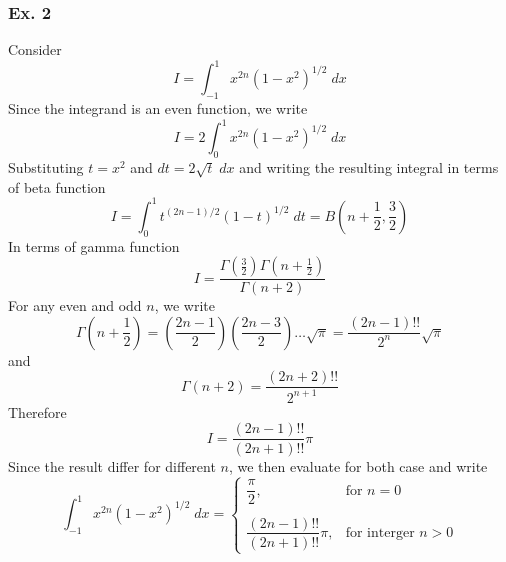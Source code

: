 \documentclass[../../main.tex]{subfiles}
\begin{document}
\subsubsection*{Ex. 2} Consider 
\begin{equation*}
    I=\int_{-1}^{1}x^{2n}(1-x^2)^{1/2}\;dx
\end{equation*}
Since the integrand is an even function, we write 
\begin{equation*}
    I=2\int_{0}^{1}x^{2n}(1-x^2)^{1/2}\;dx
\end{equation*}
Substituting $t=x^2$ and $dt=2\sqrt{t}\;dx$ and writing the resulting integral in terms of beta function
\begin{equation*}
    I=\int_{0}^{1}t^{(2n-1)/2}(1-t)^{1/2}\;dt=B\left(n+\frac{1}{2}, \frac{3}{2}\right)
\end{equation*}
In terms of gamma function
\begin{equation*}
    I=\frac{\Gamma\left(\frac{3}{2}\right)\Gamma\left(n+\frac{1}{2}\right)}{\Gamma(n+2)}
\end{equation*}
For any even and odd $n$, we write 
\begin{equation*}
    \Gamma\left(n+\frac{1}{2}\right)=\left(\frac{2n-1}{2}\right)\left(\frac{2n-3}{2}\right) \dots \sqrt{\pi}=\frac{(2n-1)!!}{2^n}\sqrt{\pi}
\end{equation*}
and 
\begin{equation*}
    \Gamma(n+2)=\frac{(2n+2)!!}{2^{n+1}}
\end{equation*}
Therefore
\begin{equation*}
    I= \frac{(2n-1)!!}{(2n+1)!!}\pi
\end{equation*}
Since the result differ for different $n$, we then evaluate for both case and write 
\begin{equation*}
    \int_{-1}^{1}x^{2n}(1-x^2)^{1/2}\;dx=\begin{cases}
        \dfrac{\pi}{2},&\text{for $n=0$}\\\\
        \dfrac{(2n-1)!!}{(2n+1)!!}\pi,&\text{for interger $n>0$}
    \end{cases}
\end{equation*}
\end{document}
